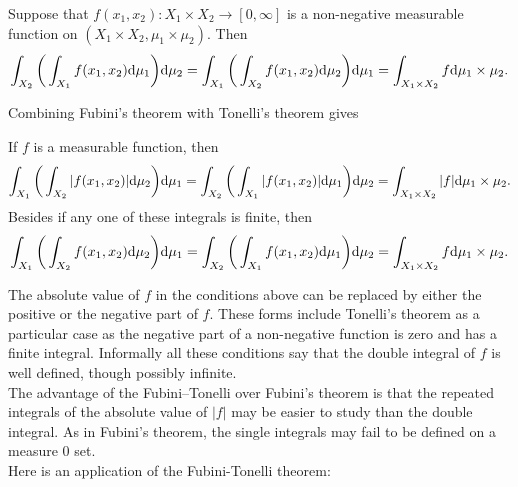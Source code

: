 \begin{theorem} \label{thm:Tonelli_theorem}
Suppose that $f(x_1, x_2) : X_1 \times X_2 \to [0, \infty]$ is a non-negative measurable function on $(X_1 \times X_2, \mu_1 \times \mu_2)$. Then
\begin{equation}
\int_{X_2} \bigg(\int_{X_1} f(x_1, x_2) \mathrm{d} \mu_1 \bigg) \mathrm{d} \mu_2 = \int_{X_1} \bigg(\int_{X_2} f(x_1, x_2) \mathrm{d} \mu_2 \bigg) \mathrm{d} \mu_1 = \int_{X_1 \times X_2} f \mathrm{d} \mu_1 \times \mu_2.
\end{equation}
\end{theorem}
Combining Fubini's theorem with Tonelli's theorem gives 
\begin{theorem}
If $f$ is a measurable function, then
\begin{equation}
    \int_{X_1} \bigg(\int_{X_2} |f(x_1, x_2)| \mathrm{d} \mu_2 \bigg) \mathrm{d} \mu_1 = \int_{X_2} \bigg(\int_{X_1} |f(x_1, x_2)| \mathrm{d} \mu_1 \bigg) \mathrm{d} \mu_2 = \int_{X_1 \times X_2} |f| \mathrm{d} \mu_1 \times \mu_2.
\end{equation}
Besides if any one of these integrals is finite, then
\begin{equation*}
    \int_{X_1} \bigg(\int_{X_2} f(x_1, x_2) \mathrm{d} \mu_2 \bigg) \mathrm{d} \mu_1 = \int_{X_2} \bigg(\int_{X_1} f(x_1, x_2) \mathrm{d} \mu_1 \bigg) \mathrm{d} \mu_2 = \int_{X_1 \times X_2} f \mathrm{d} \mu_1 \times \mu_2.
\end{equation*}
\end{theorem}
The absolute value of $f$ in the conditions above can be replaced by either the positive or the negative part of $f$. These forms include Tonelli's theorem as a particular case as the negative part of a non-negative function is zero and has a finite integral. Informally all these conditions say that the double integral of $f$ is well defined, though possibly infinite.\\

The advantage of the Fubini–Tonelli over Fubini's theorem is that the repeated integrals of the absolute value of $|f|$ may be easier to study than the double integral. As in Fubini's theorem, the single integrals may fail to be defined on a measure $0$ set. \\

Here is an application of the Fubini-Tonelli theorem:

